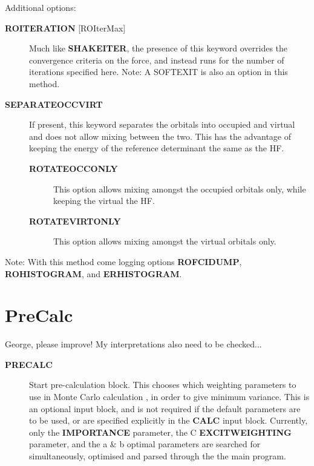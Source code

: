 \documentclass[openany,a4paper,10pt]{manual}
\begin{document}
Additional options:
\begin{description}
\item[\textbf{ROITERATION} {[}ROIterMax{]}]
Much like \textbf{SHAKEITER}, the presence of this keyword overrides the convergence criteria
on the force, and instead runs for the number of iterations specified here.
Note: A SOFTEXIT is also an option in this method.

\item[\textbf{SEPARATEOCCVIRT}]
If present, this keyword separates the orbitals into occupied and virtual and does not
allow mixing between the two.
This has the advantage of keeping the energy of the reference determinant the same as the HF.
\begin{description}
\item[\textbf{ROTATEOCCONLY}]
This option allows mixing amongst the occupied orbitals only, while keeping the virtual
the HF.

\item[\textbf{ROTATEVIRTONLY}]
This option allows mixing amongst the virtual orbitals only.

\end{description}

\end{description}

Note: With this method come logging options \textbf{ROFCIDUMP}, \textbf{ROHISTOGRAM}, and \textbf{ERHISTOGRAM}.

\resetcurrentobjects


\hypertarget{input-precalc}{}\section{PreCalc}

\begin{notice}[note]
George, please improve!  My interpretations also need to be checked...
\end{notice}
\begin{description}
\item[\textbf{PRECALC}]
Start pre-calculation block.  This chooses which weighting parameters
to use in Monte Carlo calculation , in order to give minimum variance.
This is an optional input block, and is not required if the default
parameters are to be used, or are specified explicitly in the \textbf{CALC}
input block.  Currently, only the \textbf{IMPORTANCE} parameter, the C
\textbf{EXCITWEIGHTING} parameter, and the a \& b optimal parameters are
searched for simultaneously, optimised and parsed through the the
main program.

\end{description}
\end{document}
